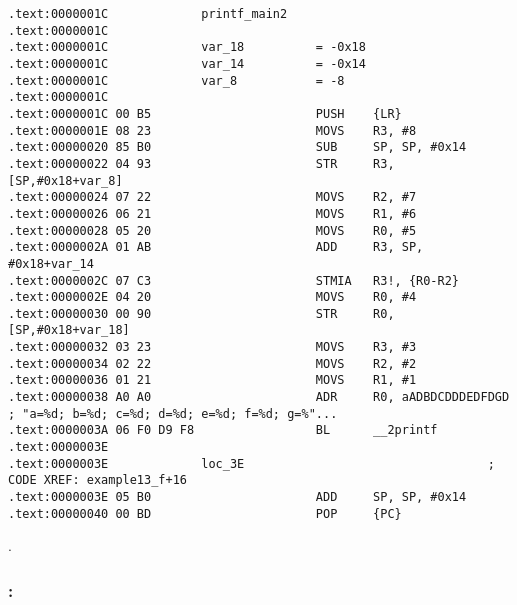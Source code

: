 \begin{lstlisting}
.text:0000001C             printf_main2
.text:0000001C
.text:0000001C             var_18          = -0x18
.text:0000001C             var_14          = -0x14
.text:0000001C             var_8           = -8
.text:0000001C
.text:0000001C 00 B5                       PUSH    {LR}
.text:0000001E 08 23                       MOVS    R3, #8
.text:00000020 85 B0                       SUB     SP, SP, #0x14
.text:00000022 04 93                       STR     R3, [SP,#0x18+var_8]
.text:00000024 07 22                       MOVS    R2, #7
.text:00000026 06 21                       MOVS    R1, #6
.text:00000028 05 20                       MOVS    R0, #5
.text:0000002A 01 AB                       ADD     R3, SP, #0x18+var_14
.text:0000002C 07 C3                       STMIA   R3!, {R0-R2}
.text:0000002E 04 20                       MOVS    R0, #4
.text:00000030 00 90                       STR     R0, [SP,#0x18+var_18]
.text:00000032 03 23                       MOVS    R3, #3
.text:00000034 02 22                       MOVS    R2, #2
.text:00000036 01 21                       MOVS    R1, #1
.text:00000038 A0 A0                       ADR     R0, aADBDCDDDEDFDGD ; "a=%d; b=%d; c=%d; d=%d; e=%d; f=%d; g=%"...
.text:0000003A 06 F0 D9 F8                 BL      __2printf
.text:0000003E
.text:0000003E             loc_3E                                  ; CODE XREF: example13_f+16
.text:0000003E 05 B0                       ADD     SP, SP, #0x14
.text:00000040 00 BD                       POP     {PC}
\end{lstlisting}

.

\subsubsection{\OptimizingXcode: \ARMMode}

